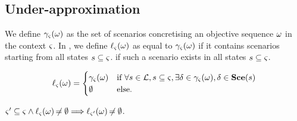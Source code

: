 \subsection{Under-approximation}

We define $\gamma_\varsigma(\omega)$ as the set of scenarios concretising an objective sequence $\omega$ in the context $\varsigma$.
In , we define $\ell_\varsigma(\omega)$ as equal to $\gamma_\varsigma(\omega)$ if it contains scenarios starting from all states $s \subseteq \varsigma$.
if such a scenario exists in all states $s \subseteq \varsigma$.

\begin{comment}
\begin{definition}[$\concr: \OS \mapsto \powerset(\Sce)$]
\label{def:concr}
\towrite{Simplifier ? Supprimer la def formelle ?}
  For a given $\w \in \OS$, $\concr(\w)$ is the set of scenarios concretising $\w$ in the context $\ctx$:
  \begin{align*}
    \concr(\w) = \{ \delta \in \Sce \mid & (\w^\vartriangle = \emptyseq \wedge \delta = \emptyseq) 
      \vee (\w^\vartriangle \neq \emptyseq \wedge \supp(\delta) \subseteq \ctx
    \\ &
      \wedge \exists \phi:\indexes{\w} \mapsto \indexes{\delta}, (\forall n, m \in \indexes{\w}, n < m \Leftrightarrow \phi(n) \leq \phi(m)) 
    \\ &
      \wedge \forall n \in \indexes{\w}, \PHbounce(\w_n) \in \ctx \PHplay \delta_{1..\phi(n)})
    \}
    \enspace,
  \end{align*}
  where $\omega^\vartriangle$ refers to the sequence of objectives $\omega$ where the trivial objectives have been removed.
\end{definition}
%
\begin{definition}[$\concr: \powerset(\OS) \mapsto \powerset(\Sce)$]
\label{def:concr-set}
  $\concr(\W) = \{ \delta \in \concr(\w) \mid \w \in \W \} \enspace.$
\end{definition}
\end{comment}

\begin{definition}[$\uconcr: \OS \mapsto \powerset(\Sce)$]
\label{def:uconcr}
  \[
  \ell_\varsigma(\omega) = 
  \begin{cases}
    \gamma_\varsigma(\omega) & \text{if } \forall s \in \mathcal{L}, s \subseteq \varsigma, \exists \delta \in \gamma_\varsigma(\omega), \delta \in \mathbf{Sce}(s) \\
    \emptyset & \text{else.}
  \end{cases}
  \]
\end{definition}
% 
\begin{theorem}
\label{th:uconcr-ctx}
  $\varsigma' \subseteq \varsigma \wedge \ell_\varsigma(\omega) \not\nobreak\mkern -2mu = \emptyset \Longrightarrow \ell_{\varsigma'}(\omega) \not\nobreak\mkern -2mu = \emptyset$.
\end{theorem}

